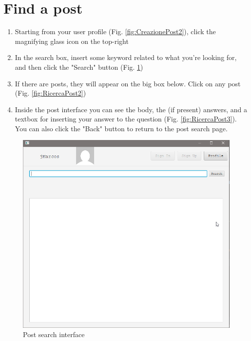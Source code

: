 \documentclass[11pt]{report}
\begin{document}
\section{Find a post}
\begin{enumerate}
    \item Starting from your user profile (Fig. \ref{fig:CreazionePost2}), click the magnifying glass icon on the top-right
    \item In the search box, insert some keyword related to what you're looking for, and then click the "Search" button (Fig. \ref{fig:RicercaPost1})
    \item If there are posts, they will appear on the big box below. Click on any post (Fig. \ref{fig:RicercaPost2})
    \item Inside the post interface you can see the body, the (if present) answers, and a textbox for inserting your answer to the question (Fig. \ref{fig:RicercaPost3}). You can also click the "Back" button to return to the post search page.
\end{enumerate}
\begin{figure}[H]
  \centering
  \includegraphics[width=\textwidth,keepaspectratio=true]{img/user_manual/RicercaPost1.png}
  \caption{Post search interface}
  \label{fig:RicercaPost1}
\end{figure}
\end{document}
